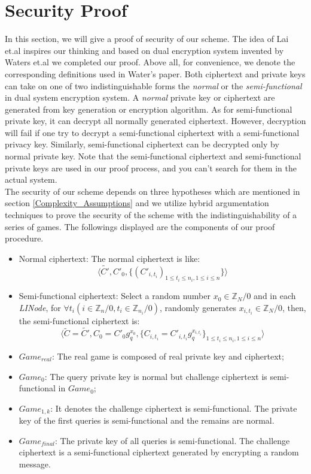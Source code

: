 \documentclass[smallextended]{svjour3}       %
\begin{document}
 
\section{Security Proof}\label{section4}
In this section, we will give a proof of security of our scheme. The idea of Lai et.al inspires our thinking and based on dual encryption system invented by Waters et.al we completed our proof. Above all, for convenience, we denote the corresponding definitions used in Water's paper. Both ciphertext and private keys can take on one of two indistinguishable forms the \textit{normal} or the \textit{semi-functional} in dual system encryption system. A \textit{normal} private key or ciphertext are generated from key generation or encryption algorithm. As for semi-functional private key, it can decrypt all normally generated ciphertext. However, decryption will fail if one try to decrypt a semi-functional ciphertext with a semi-functional privacy key. Similarly, semi-functional ciphertext can be decrypted only by normal private key. Note that the semi-functional ciphertext and semi-functional private keys are used in our proof process, and you can't search for them in the actual system.\\
The security of our scheme depends on three hypotheses which are mentioned in section \ref{Complexity_Assumptions} and we utilize hybrid argumentation techniques to prove the security of the scheme with the indistinguishability of a series of games. The followings displayed are the components of our proof procedure.
\begin{itemize}
	\item Normal ciphertext: The normal ciphertext is like: 
	\begin{equation}
		\langle \tilde{C'},C'_0,\{(C'_{i,t_i})_{1 \leq t_i \leq n_i, 1 \leq i \leq n}\}  \rangle
	\end{equation}
	\item Semi-functional ciphertext: Select a random number $x_0 \in \mathbb{Z}_N/0$ and in each \textit{LINode}, for $\forall t_i(i \in \mathbb{Z}_n/0,t_i \in \mathbb{Z}_{n_i}/0)$, randomly generates $x_{i, t_i} \in \mathbb{Z}_N/0$, then, the semi-functional ciphertext is: 
	\begin{equation}
		\langle \tilde{C}=\tilde{C'},C_0=C'_0g_q^{x_0},\{C_{i,t_i}=C'_{i,t_i}g_q^{x_{i,t_i}}\}_{1 \leq t_i \leq n_i, 1 \leq i \leq n} \rangle
	\end{equation}	
\end{itemize}
\begin{itemize}
	\item $Game_{real}$: The real game is composed of real private key and ciphertext;
	\item $Game_0$: The query private key is normal but challenge ciphertext is semi-functional in $Game_0$;
	\item $Game_{1,k}$: It denotes the challenge ciphertext is semi-functional. The private key of the first queries is semi-functional and the remains are normal.
	\item $Game_{final}$: The private key of all queries is semi-functional. The challenge ciphertext is a semi-functional ciphertext generated by encrypting a random message.
\end{itemize}
\end{document}
